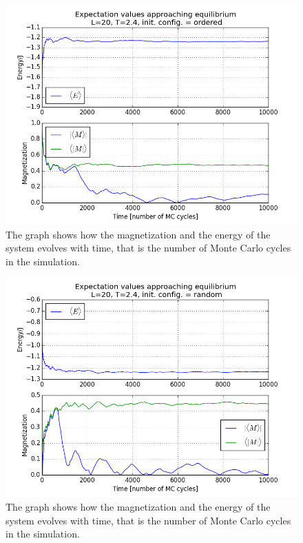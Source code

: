 \documentclass[norsk, 10pt, twocolumn, a4paper]{revtex4}
\begin{document}
\begin{figure}
    \includegraphics[width=0.9\linewidth]{c_ordered_L20t24mcE4.png}
    \caption{
        \label{fig:c3}
        The graph shows how the magnetization and the energy of the system evolves with time,
        that is the number of Monte Carlo cycles in the simulation.}
\end{figure}
\begin{figure}
    \includegraphics[width=0.9\linewidth]{c_random_L20t24mcE4.png}
    \caption{
        \label{fig:c4}
        The graph shows how the magnetization and the energy of the system evolves with time,
        that is the number of Monte Carlo cycles in the simulation.}
\end{figure}
\end{document}
